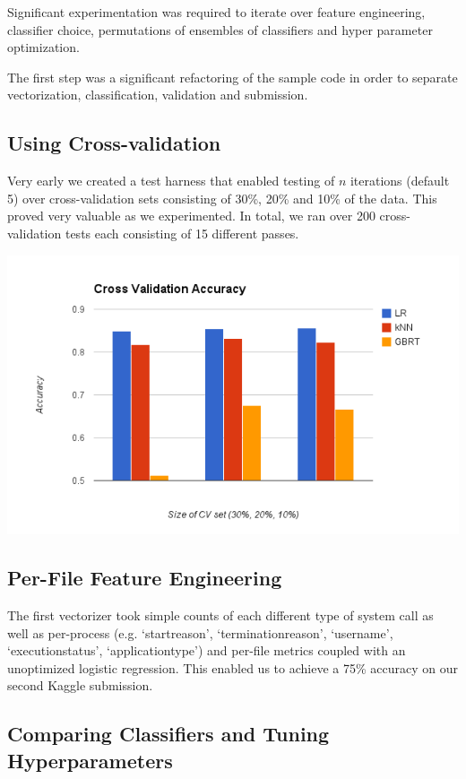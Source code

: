 \documentclass[11pt, oneside]{article}   	%
\begin{document}
Significant experimentation was required to iterate over feature engineering, classifier choice, permutations of ensembles of classifiers and hyper parameter optimization.

The first step was a significant refactoring of the sample code in order to separate vectorization, classification, validation and submission.

\subsection*{Using Cross-validation}

Very early we created a test harness that enabled testing of $n$ iterations (default 5) over cross-validation sets consisting of 30\%, 20\% and 10\% of the data. This proved very valuable as we experimented. In total, we ran over 200 cross-validation tests each consisting of 15 different passes.
\begin{center}
\includegraphics[scale=.6]{cv_error}
\end{center}

\subsection*{Per-File Feature Engineering}

The first vectorizer took simple counts of each different type of system call as well as per-process (e.g. `startreason', `terminationreason', `username', `executionstatus', `applicationtype') and per-file metrics coupled with an unoptimized logistic regression. This enabled us to achieve a 75\% accuracy on our second Kaggle submission.

\subsection*{Comparing Classifiers and Tuning Hyperparameters}
\end{document}
